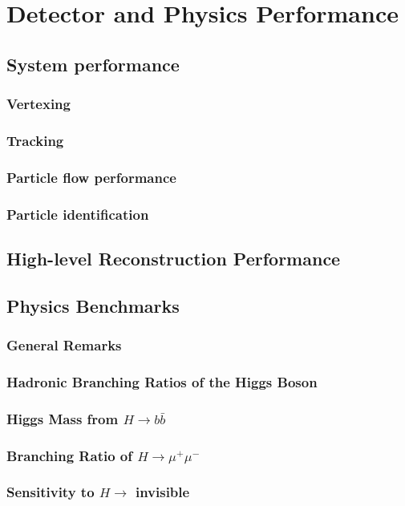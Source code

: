 \chapter{Detector and Physics Performance}
\section{System performance}
\subsection{Vertexing}
\subsection{Tracking}
\subsection{Particle flow performance}
\subsection{Particle identification}
\section{High-level Reconstruction Performance}
\section{Physics Benchmarks}
\subsection{General Remarks}
\subsection{Hadronic Branching Ratios of the Higgs Boson}
\subsection{Higgs Mass from $H \to b\bar{b}$}
\subsection{Branching Ratio of $H \to \mu^+\mu^-$}
\subsection{Sensitivity to $H \to $ invisible}

